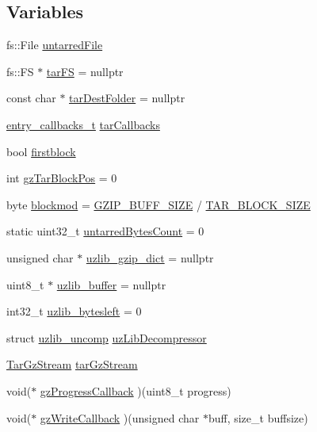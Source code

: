 \subsection*{Variables}
\begin{DoxyCompactItemize}
\item 
fs\+::\+File \hyperlink{ESP32-targz_8cpp_a27c6deb00092ef8dcbb8453d8d75118c}{untarred\+File}
\item 
fs\+::\+FS $\ast$ \hyperlink{ESP32-targz_8cpp_a3b84972f195ce18f9882623a6081c0ab}{tar\+FS} = nullptr
\item 
const char $\ast$ \hyperlink{ESP32-targz_8cpp_a8f75ed6166f2292a78695da999d4e899}{tar\+Dest\+Folder} = nullptr
\item 
\hyperlink{untar_8h_a374771851af07213954828f59117f68f}{entry\+\_\+callbacks\+\_\+t} \hyperlink{ESP32-targz_8cpp_ab606c7afa05f59753173480a0e48e52c}{tar\+Callbacks}
\item 
bool \hyperlink{ESP32-targz_8cpp_af138d603a671d34202e2087ade77f51c}{firstblock}
\item 
int \hyperlink{ESP32-targz_8cpp_ace8e3812bfd7f8ece336032b2b0883e2}{gz\+Tar\+Block\+Pos} = 0
\item 
byte \hyperlink{ESP32-targz_8cpp_a14b682b5d3d66207698676af37190879}{blockmod} = \hyperlink{ESP32-targz_8cpp_ab570e96e8879b39cfc62a83a131ac42c}{G\+Z\+I\+P\+\_\+\+B\+U\+F\+F\+\_\+\+S\+I\+ZE} / \hyperlink{untar_8h_ade324f8761934ace1ac409ee36bcb2aa}{T\+A\+R\+\_\+\+B\+L\+O\+C\+K\+\_\+\+S\+I\+ZE}
\item 
static uint32\+\_\+t \hyperlink{ESP32-targz_8cpp_a0243b6b9c976cd53260751c06a7567fc}{untarred\+Bytes\+Count} = 0
\item 
unsigned char $\ast$ \hyperlink{ESP32-targz_8cpp_ab5d8d8dd8d5eafad9f67fd554c2da7d0}{uzlib\+\_\+gzip\+\_\+dict} = nullptr
\item 
uint8\+\_\+t $\ast$ \hyperlink{ESP32-targz_8cpp_a1a011f634269f5246239595723245998}{uzlib\+\_\+buffer} = nullptr
\item 
int32\+\_\+t \hyperlink{ESP32-targz_8cpp_a88932439c8806442cd4db4594dbde1a1}{uzlib\+\_\+bytesleft} = 0
\item 
struct \hyperlink{structuzlib__uncomp}{uzlib\+\_\+uncomp} \hyperlink{ESP32-targz_8cpp_acf2784175a7cb1eeb42cb04759102d56}{uz\+Lib\+Decompressor}
\item 
\hyperlink{structTarGzStream}{Tar\+Gz\+Stream} \hyperlink{ESP32-targz_8cpp_a266d9da699ec01c8a4ebaa29ae3d5315}{tar\+Gz\+Stream}
\item 
void($\ast$ \hyperlink{ESP32-targz_8cpp_acc3af8a618d3c303aa31120f2eb40f3c}{gz\+Progress\+Callback} )(uint8\+\_\+t progress)
\item 
void($\ast$ \hyperlink{ESP32-targz_8cpp_a488bc5d9b48f2a9abdfcbbae2da28c16}{gz\+Write\+Callback} )(unsigned char $\ast$buff, size\+\_\+t buffsize)
\end{DoxyCompactItemize}


